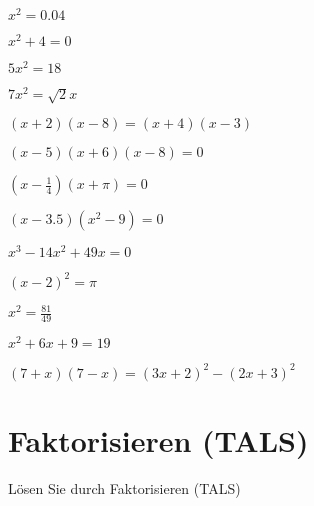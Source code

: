 \begin{bbwAufgabenBlock}
\item $x^2 = 0.04$

\item $ x^2 + 4= 0$
\LoesungsBlock{$\lx= \left\{ \right\}$}

\item $ 5x^2= 18$

\item $ 7x^2= \sqrt{2} x$

\item $ (x+2)(x-8) = (x+4)(x-3)$

\item $ (x-5) (x+6) (x-8)= 0$

\item $ (x-\frac14)(x+\pi)= 0$

\item $ (x-3.5)(x^2-9)= 0$

\item $ x^3 -14x^2 + 49x=  0$

\item $ (x-2)^2= \pi$

\item $x^2 = \frac{81}{49}$

\item $x^2 + 6x + 9 = 19$

\item $ (7+x)(7-x)= (3x+2)^2 - (2x + 3)^2$

\end{bbwAufgabenBlock}
\newpage

\section{Faktorisieren (TALS)}
Lösen Sie durch Faktorisieren (TALS)

